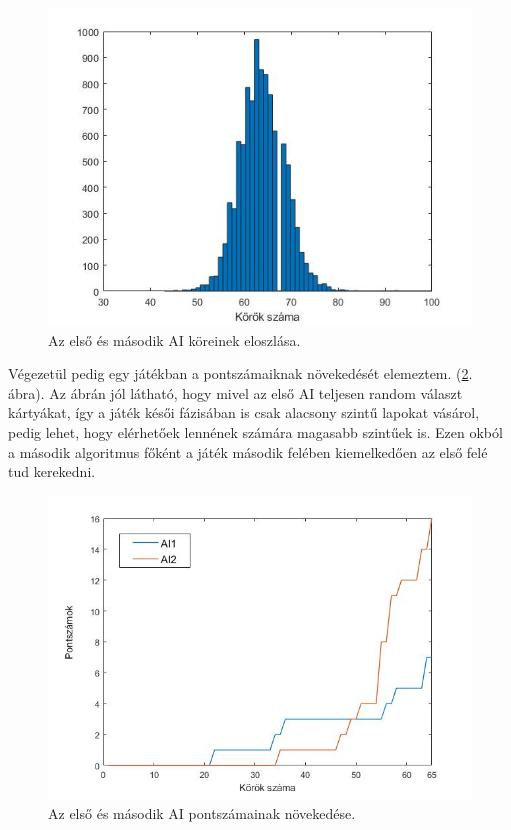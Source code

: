 \begin{figure}[h]
\centering
\includegraphics[scale=0.5]{images/round_number_hist_AI1vsAI2.jpg}
\caption{Az első és második AI köreinek eloszlása.}
\label{fig:rounds1v2}
\end{figure}

Végezetül pedig egy játékban a pontszámaiknak növekedését elemeztem. (\ref{fig:player_scores1v2}. ábra). Az ábrán jól látható, hogy mivel az első AI teljesen random választ kártyákat, így a játék késői fázisában is csak alacsony szintű lapokat vásárol, pedig lehet, hogy elérhetőek lennének számára magasabb szintűek is. Ezen okból a második algoritmus főként a játék második felében kiemelkedően az első felé tud kerekedni.

\begin{figure}[h]
\centering
\includegraphics[scale=0.5]{images/player_points_AI1vsAI2.jpg}
\caption{Az első és második AI pontszámainak növekedése.}
\label{fig:player_scores1v2}
\end{figure}

